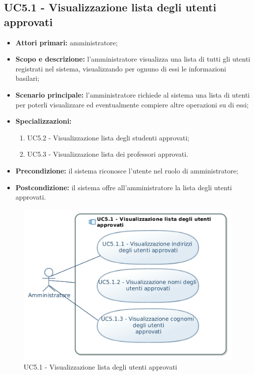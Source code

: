 \documentclass[AnalisiDeiRequisiti.tex]{subfiles}
\begin{document}
\subsection{UC5.1 - Visualizzazione lista degli utenti approvati}
\begin{itemize}
	\item \textbf{Attori primari:} amministratore;
	\item \textbf{Scopo e descrizione:} l'amministratore visualizza una lista di tutti gli utenti registrati nel sistema, visualizzando per ognuno di essi le informazioni basilari;
	\item \textbf{Scenario principale:} l'amministratore richiede al sistema una lista di utenti per poterli visualizzare ed eventualmente compiere altre operazioni su di essi;
	\item \textbf{Specializzazioni:}
	\begin{enumerate}
		\item UC5.2 - Visualizzazione lista degli studenti approvati;
		\item UC5.3 - Visualizzazione lista dei professori approvati.
	\end{enumerate}
	\item \textbf{Precondizione:} il sistema riconosce l'utente nel ruolo di amministratore; 
	\item \textbf{Postcondizione:} il sistema offre all'amministratore la lista degli utenti approvati.
\end{itemize}
\begin{figure}[H]
	\centering
	\includegraphics[width=0.9\linewidth]{UC5_1.jpg}
	\caption{UC5.1 - Visualizzazione lista degli utenti approvati}
	\label{fig:UC5.1 - Visualizzazione lista degli utenti approvati}
\end{figure}
\end{document}
